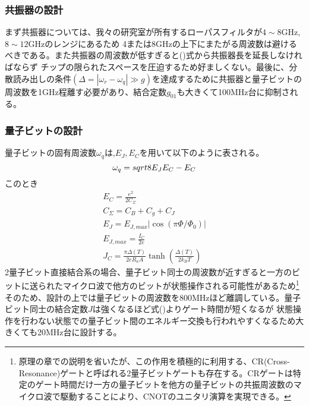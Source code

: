 \subsubsection{共振器の設計}
まず共振器については、我々の研究室が所有するローパスフィルタが$4 \sim 8$GHz,$8 \sim 12$GHzのレンジにあるため
4または8GHzの上下にまたがる周波数は避けるべきである。また共振器の周波数が低すぎると()式から共振器長を延長しなければならず
チップの限られたスペースを圧迫するため好ましくない。最後に、分散読み出しの条件$(\Delta = |\omega_r − \omega_q|\gg g)$を達成するために共振器と量子ビットの周波数を1GHz程離す必要があり、結合定数$g_{01}$も大きくて100MHz台に抑制される。
\subsubsection{量子ビットの設計}
量子ビットの固有周波数$\omega_q$は,$E_J,E_C$を用いて以下のように表される。
\begin{equation}
    \omega_q = sqrt{8E_JE_C}-E_C \\
\end{equation}
このとき
\begin{equation}
    \begin{aligned}
        E_C = \frac{e^2}{2C_{\Sigma}}\\
        C_{\Sigma} = C_B+C_g+C_J\\
        E_J = E_{J,max}|\cos(\pi \Phi/\Phi_0)| \\
        E_{J,max} = \frac{I_C}{2e} \\
        J_{C}=\frac{\pi \Delta(T)}{2 e R_{n} A} \tanh \left(\frac{\Delta(T)}{2 k_{B} T}\right)
    \end{aligned}
\end{equation}
2量子ビット直接結合系の場合、量子ビット同士の周波数が近すぎると一方のビットに送られたマイクロ波で他方のビットが状態操作される可能性があるため\footnote{原理の章での説明を省いたが、この作用を積極的に利用する、CR(Cross-Resonance)ゲートと呼ばれる2量子ビットゲートも存在する。CRゲートは特定のゲート時間だけ一方の量子ビットを他方の量子ビットの共振周波数のマイクロ波で駆動することにより、CNOTのユニタリ演算を実現できる。}
そのため、設計の上では量子ビットの周波数を800MHzほど離調している。量子ビット同士の結合定数$J$は強くなるほど式()よりゲート時間が短くなるが
状態操作を行わない状態での量子ビット間のエネルギー交換も行われやすくなるため大きくても20MHz台に設計する。

